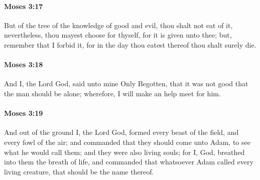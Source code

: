 		\paragraph{Moses 3:17} %
			\label{MOSES-3-17}

			But of the tree of the knowledge of good and evil, thou shalt not eat of it, nevertheless, thou mayest choose for thyself, for it is given unto thee; but, remember that I forbid it, for in the day thou eatest thereof thou shalt surely die.


		\paragraph{Moses 3:18} %
			\label{MOSES-3-18}

			And I, the Lord God, said unto mine Only Begotten, that it was not good that the man should be alone; wherefore, I will make an help meet for him.


		\paragraph{Moses 3:19} %
			\label{MOSES-3-19}

			And out of the ground I, the Lord God, formed every beast of the field, and every fowl of the air; and commanded that they should come unto Adam, to see what he would call them; and they were also living souls; for I, God, breathed into them the breath of life, and commanded that whatsoever Adam called every living creature, that should be the name thereof.


